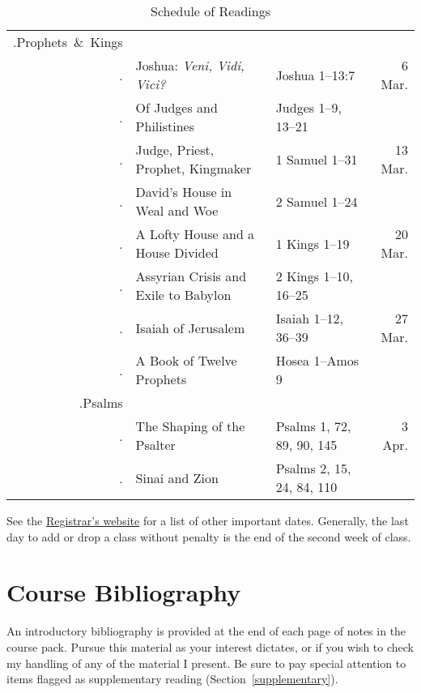 \documentclass[titlepage]{article}
\begin{document}
\begin{table}[phtb]
\begin{tabular}{>{\sessioncount.}r@{ }llr}
    \unit{Prophets \& Kings}                                                                \\
          & Joshua: \emph{Veni, Vidi, Vici?}          & Joshua 1--13:7            &  6 Mar. \\
          & Of Judges and Philistines                 & Judges 1--9, 13--21       &         \\
          & Judge, Priest, Prophet, Kingmaker         & 1 Samuel 1--31            & 13 Mar. \\
          & David's House in Weal and Woe             & 2 Samuel 1--24            &         \\
          & A Lofty House and a House Divided         & 1 Kings 1--19             & 20 Mar. \\
          & Assyrian Crisis and Exile to Babylon      & 2 Kings 1--10, 16--25     &         \\
          & Isaiah of Jerusalem                       & Isaiah 1--12, 36--39      & 27 Mar. \\
          & A Book of Twelve Prophets                 & Hosea 1--Amos 9           &         \\ [1ex]
    \unit{Psalms}                                                                           \\
          & The Shaping of the Psalter                & Psalms 1, 72, 89, 90, 145 &  3 Apr. \\
          & Sinai and Zion                            & Psalms 2, 15, 24, 84, 110 &         \\
    \bottomrule
  \end{tabular}
  \caption{Schedule of Readings}
  \label{schedule}
\end{table}

See the \href{http://www.tyndale.ca/registrar/important-dates}{%
Registrar's website} for a list of other important dates. Generally, the
last day to add or drop a class without penalty is the end of the second
week of class.

\section{Course Bibliography}
\label{bibliography}

An introductory bibliography is provided at the end of each page
of notes in the course pack. Pursue this material as your interest
dictates, or if you wish to check my handling of any of the material
I present. Be sure to pay special attention to items flagged as
supplementary reading (Section~\ref{supplementary}).
\end{document}
